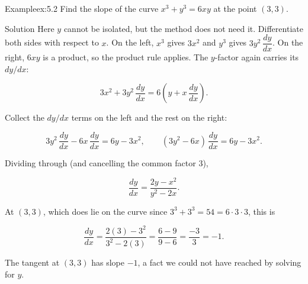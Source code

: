 \documentclass[a4paper,12pt,oneside]{memoir}
\begin{document}
\begin{workedexample}
\begin{envexample}{Example}{ex:5.2}{}
Find the slope of the curve \(x^{3} + y^{3} = 6xy\) at the point \((3, 3)\).
\end{envexample}
\begin{envsolution}{Solution}{}{}
Here \(y\) cannot be isolated, but the method does not need it. Differentiate both sides with respect to \(x\). On the left, \(x^{3}\) gives \(3x^{2}\) and \(y^{3}\) gives \(3y^{2}\,\dfrac{dy}{dx}\). On the right, \(6xy\) is a product, so the product rule applies. The \(y\)-factor again carries its \(dy/dx\):

\[ 3x^{2} + 3y^{2}\,\frac{dy}{dx} = 6\!\left(y + x\,\frac{dy}{dx}\right). \]

Collect the \(dy/dx\) terms on the left and the rest on the right:

\[ 3y^{2}\,\frac{dy}{dx} - 6x\,\frac{dy}{dx} = 6y - 3x^{2}, \qquad (3y^{2} - 6x)\,\frac{dy}{dx} = 6y - 3x^{2}. \]

Dividing through (and cancelling the common factor \(3\)),

\[ \frac{dy}{dx} = \frac{2y - x^{2}}{y^{2} - 2x}. \]

At \((3, 3)\), which does lie on the curve since \(3^{3} + 3^{3} = 54 = 6\cdot 3\cdot 3\), this is

\[ \frac{dy}{dx} = \frac{2(3) - 3^{2}}{3^{2} - 2(3)} = \frac{6 - 9}{9 - 6} = \frac{-3}{3} = -1. \]

The tangent at \((3, 3)\) has slope \(-1\), a fact we could not have reached by solving for \(y\). \qedmark
\end{envsolution}
\end{workedexample}
\end{document}
